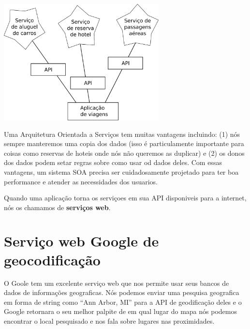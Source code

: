 \beforefig
\centerline{\includegraphics[height=2.50in]{figs2/soa.eps}}
\afterfig
Uma Arquitetura Orientada a Serviços tem muitas vantagens incluindo: (1)
nós sempre manteremos uma copia dos dados (isso é particulamente importante
para coisas como reservas de hoteis onde nós não queremos as duplicar)
e (2) os donos dos dados podem setar regras sobre como usar od dados deles.
Com essas vantagens, um sistema SOA precisa ser cuidadosamente projetado
para ter boa performance e atender as necessidades dos usuarios.

Quando uma aplicação torna os serviçoes em sua API disponiveis para a internet,
nós os chamamos de {\bf serviços web}.

\section{Serviço web Google de geocodificação}

O Goole tem um excelente serviço web que nos permite usar seus bancos de
dados de informações geograficas. Nós podemos enviar uma pesquisa geografica 
em forma de string como ``Ann Arbor, MI'' para a API de geodificação deles e o 
Google retornara o seu melhor palpite de em qual lugar do mapa nós podemos 
encontrar o local pesquisado e nos fala sobre lugares nas proximidades. 



